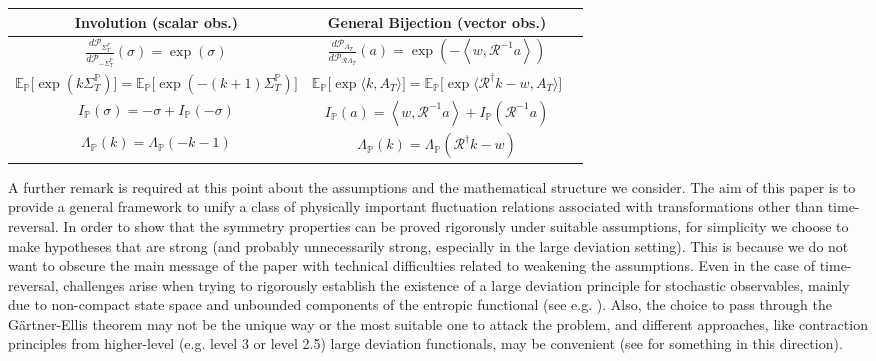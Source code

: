 \documentclass[a4paper,11pt]{article}
\numberwithin{equation}{section}
\begin{document}
\begin{table}[!h] 

\begingroup
\setlength{\tabcolsep}{4pt}
\renewcommand{\arraystretch}{1.8}
\begin{center}
\begin{tabular}{ |c|c|c| } 
 \hline
 Involution (scalar obs.) &  General Bijection (vector obs.)\\
 \hline
 $\frac{d\mathcal{P}_{\varSigma_{T}^{\mathbb{P}}}}{d\mathcal{P}_{-\varSigma_{T}^{\mathbb{P}}}} (\sigma) = \exp(\sigma) $  & $\frac{d\mathcal{P}_{A_T}}{d\mathcal{P}_{\mathcal{R}A_T}}(a)=\exp \left(-\left\langle w,\mathcal{R}^{-1} a\right\rangle \right)$ \\ $\mathbb{E}_{\mathbb{P}}\Big[\exp\left(k\varSigma_{T}^{\mathbb{P}}\right)\Big]=\mathbb{E}_{\mathbb{P}}\Big[\exp\left(-\left(k+1\right)\varSigma_{T}^{\mathbb{P}}\right)\Big]$ & $\mathbb{E}_{\mathbb{P}}\Big[\exp\Big\langle k,A_T\Big\rangle \Big]=\mathbb{E}_{\mathbb{P}}\Big[\exp \Big\langle \mathcal{R}^{\dagger} k - w,A_T\Big\rangle \Big] $ \\
 $I_{\mathbb{P}}\left(\sigma\right)=-\sigma+I_{\mathbb{P}}\left(-\sigma\right)$ 
& $  I_{\mathbb{P}}\left(a \right)=\left\langle w,\mathcal{R}^{-1} a \right\rangle +I_{\mathbb{P}}\left(\mathcal{R}^{-1} a \right) $   \\ 
 $\Lambda_{\mathbb{P}}(k)=\Lambda_{\mathbb{P}}(-k-1) $  &  $\Lambda_{\mathbb{P}}\left( k \right)=\Lambda_{\mathbb{P}}\left(\mathcal{R}^{\dagger} k -w\right)$ \\ 
 
 \hline
\end{tabular}

\end{center}
\endgroup

\end{table}


A further remark is required at this point about the assumptions and the mathematical structure we consider.  The aim of this paper is to provide a general framework to unify a class of physically important fluctuation relations associated with transformations other than time-reversal. In order to show that the symmetry properties can be proved rigorously under suitable assumptions, for simplicity we choose to make hypotheses that are strong (and probably unnecessarily strong, especially in the large deviation setting). This is because we do not want to obscure the main message of the paper with technical difficulties related to weakening the assumptions. Even in the case of time-reversal, challenges arise when trying to rigorously establish the existence of a large deviation principle for stochastic observables, mainly due to non-compact state space and unbounded components of the entropic functional (see e.g. \cite{BdG15,JPS17,Raq24}). Also, the choice to pass through the G\"artner-Ellis theorem may not be the unique way or the most suitable one to attack the problem, and different approaches, like contraction principles from higher-level (e.g. level 3 or level 2.5) large deviation functionals, may be convenient (see \cite{BGL23} for something in this direction).
\end{document}
